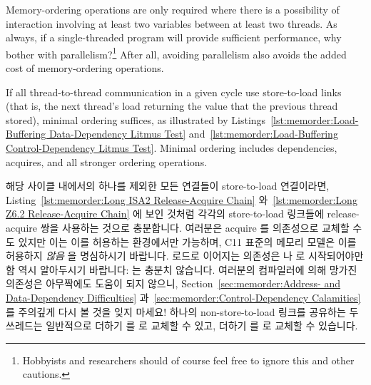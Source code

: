 Memory-ordering operations are only required where there is a possibility
of interaction involving at least two variables between at least two
threads.
As always, if a single-threaded program will provide sufficient
performance, why bother with parallelism?\footnote{
	Hobbyists and researchers should of course feel free to ignore
	this and other cautions.}
After all, avoiding parallelism also avoids the added cost of
memory-ordering operations.

If all thread-to-thread communication in a given cycle use store-to-load links
(that is, the next thread's load returning the value that the previous thread
stored), minimal ordering suffices, as illustrated by
Listings~\ref{lst:memorder:Load-Buffering Data-Dependency Litmus Test}
and~\ref{lst:memorder:Load-Buffering Control-Dependency Litmus Test}.
Minimal ordering includes dependencies, acquires, and all stronger
ordering operations.
\fi

해당 사이클 내에서의 하나를 제외한 모든 연결들이 store-to-load 연결이라면,
Listing~\ref{lst:memorder:Long ISA2 Release-Acquire Chain}
와~\ref{lst:memorder:Long Z6.2 Release-Acquire Chain} 에 보인 것처럼 각각의
store-to-load 링크들에 release-acquire 쌍을 사용하는 것으로 충분합니다.
여러분은 acquire 를 의존성으로 교체할 수도 있지만 이는 이를 허용하는 환경에서만
가능하며, C11 표준의 메모리 모델은 이를 허용하지 \emph{않음} 을 명심하시기
바랍니다.
로드로 이어지는 의존성은  나 
로 시작되어야만 함 역시 알아두시기 바랍니다:
 는 충분치 않습니다.
여러분의 컴파일러에 의해 망가진 의존성은 아무짝에도 도움이 되지 않으니,
Section~\ref{sec:memorder:Address- and Data-Dependency Difficulties}
과~\ref{sec:memorder:Control-Dependency Calamities} 를 주의깊게 다시 볼 것을 잊지 마세요!
하나의 non-store-to-load 링크를 공유하는 두 쓰레드는 일반적으로
 더하기  를  로 교체할
수 있고,  더하기  를  로
교체할 수 있습니다.

